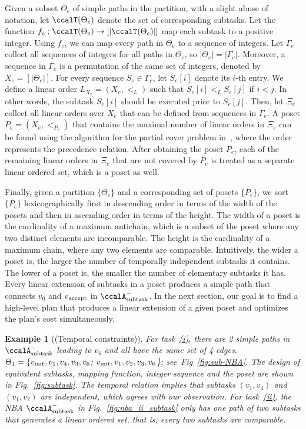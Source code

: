 \documentclass[Afour,sageh,times]{sagej}
\newtheorem{exmp}{Example}
\newcommand{\auto}[1]{\ccalA_{\textup{#1}}}
\newcommand{\vertex}[1]{v_{\textup{#1}}}
\newenvironment{cexmp}
{\addtocounter{exmp}{-1}\begin{exmp}}
  {\end{exmp}}
\begin{document}
Given a subset $\Theta_e$ of simple paths in the partition, with a slight abuse of notation, let $\ccalT(\Theta_e)$ denote the set of corresponding  subtasks. Let the function $f_e:\ccalT(\Theta_e)\to [|\ccalT(\Theta_e)|]$ map each subtask to a positive integer. Using $f_e$, we can map every path in $\Theta_e$ to a sequence of integers. Let $\Gamma_e$ collect all sequences of integers for all paths in $\Theta_e$, so $|\Theta_e| =  |\Gamma_e|$. Moreover, a sequence in $\Gamma_e$ is a permutation of the same set of integers, denoted by $X_e = [|\Theta_e|]$. For every sequence $S_e \in \Gamma_e$, let $S_e[i]$ denote its $i$-th entry. We define a linear order $L_{X_e} = (X_e, <_L)$ such that  $S_e[i]  <_L  S_e[j] $ if $i  <  j$. In other words, the subtask $S_e[i]$ should be executed prior to  $S_e[j]$. Then, let $\Xi_e$ collect all linear orders over $X_e$ that can be defined from sequences in $\Gamma_e$. A  poset $P_e  = (X_e, <_{P_e})$  that contains the maximal number of linear orders in $\Xi_e$ can be found using the algorithm for the partial cover problem in~\cite{heath2013poset}, where the order represents the precedence relation. After obtaining the poset $P_e$, each of  the remaining linear orders in $\Xi_e$ that are not covered by $P_e$ is treated as a separate linear ordered set, which is a poset as well.

{Finally, given a partition $\{\Theta_e\}$ and a corresponding set of posets $\{P_e\}$, we sort $\{P_e\}$ lexicographically first in descending order in terms of the width of the posets and then in ascending order in terms of the height.  The width of a poset is the cardinality of a maximum antichain, which is a subset of the poset where any two distinct elements are incomparable. The height is the cardinality of a maximum chain, where any two elements are comparable. Intuitively, the wider a poset is, the larger the number of temporally independent subtasks it contains. The lower of a poset is, the smaller the number of elementary subtasks it has.} Every linear extension of subtasks in a poset produces a simple path that connects $v_0$ and $\vertex{accept}$ in $\auto{subtask}^-$. In the next section, our goal is to find a high-level plan that produces a linear extension of a given poset and optimizes the plan's cost simultaneously.

\begin{cexmp}[(Temporal constraints)]
  For task~\hyperref[task:i]{\it (i)}, there are 2 simple paths in $\auto{subtask}^-$ leading to $v_6$ and all have the same set of 4 edges.  $\Theta_1 = \{\vertex{init},v_1, v_4,v_3,v_6$; $\vertex{init}, v_1, v_2,v_3, v_6$\}; see~Fig~\ref{fig:sub-NBA}.  The design of equivalent subtasks, mapping function, integer sequence and the poset are shown in Fig.~\ref{fig:subtask}. The temporal relation implies that subtasks $(v_1, v_4)$ and $(v_1, v_2)$ are independent, which agrees with our observation. For task~\hyperref[task:ii]{\it (ii)}, the NBA $\auto{subtask}^-$ in Fig.~\ref{fig:nba_ii_subtask} only has one path of two subtasks that generates a linear ordered set, that is, every two subtasks are comparable.
\end{cexmp}
\end{document}

